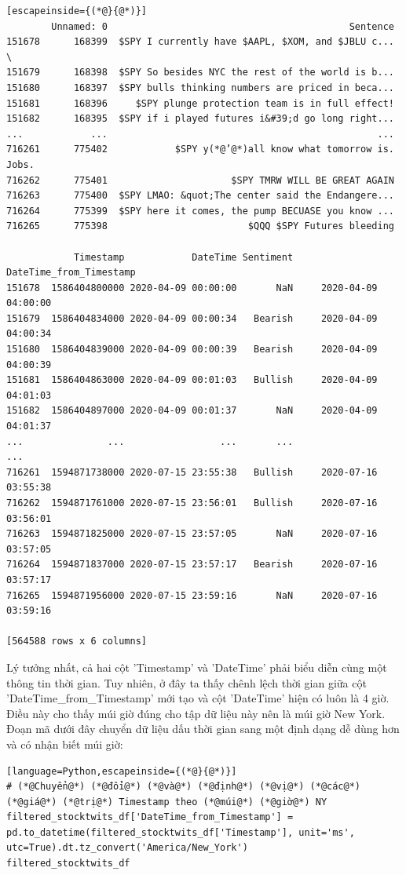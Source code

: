 \begin{lstlisting}[escapeinside={(*@}{@*)}]
        Unnamed: 0                                           Sentence   
151678      168399  $SPY I currently have $AAPL, $XOM, and $JBLU c...  \
151679      168398  $SPY So besides NYC the rest of the world is b...   
151680      168397  $SPY bulls thinking numbers are priced in beca...   
151681      168396     $SPY plunge protection team is in full effect!   
151682      168395  $SPY if i played futures i&#39;d go long right...   
...            ...                                                ...   
716261      775402            $SPY y(*@’@*)all know what tomorrow is. Jobs.   
716262      775401                      $SPY TMRW WILL BE GREAT AGAIN   
716263      775400  $SPY LMAO: &quot;The center said the Endangere...   
716264      775399  $SPY here it comes, the pump BECUASE you know ...   
716265      775398                         $QQQ $SPY Futures bleeding   

            Timestamp            DateTime Sentiment DateTime_from_Timestamp  
151678  1586404800000 2020-04-09 00:00:00       NaN     2020-04-09 04:00:00  
151679  1586404834000 2020-04-09 00:00:34   Bearish     2020-04-09 04:00:34  
151680  1586404839000 2020-04-09 00:00:39   Bearish     2020-04-09 04:00:39  
151681  1586404863000 2020-04-09 00:01:03   Bullish     2020-04-09 04:01:03  
151682  1586404897000 2020-04-09 00:01:37       NaN     2020-04-09 04:01:37  
...               ...                 ...       ...                     ...  
716261  1594871738000 2020-07-15 23:55:38   Bullish     2020-07-16 03:55:38  
716262  1594871761000 2020-07-15 23:56:01   Bullish     2020-07-16 03:56:01  
716263  1594871825000 2020-07-15 23:57:05       NaN     2020-07-16 03:57:05  
716264  1594871837000 2020-07-15 23:57:17   Bearish     2020-07-16 03:57:17  
716265  1594871956000 2020-07-15 23:59:16       NaN     2020-07-16 03:59:16  

[564588 rows x 6 columns]
\end{lstlisting}

Lý tưởng nhất, cả hai cột 'Timestamp' và 'DateTime' phải biểu diễn cùng một thông tin thời gian. Tuy nhiên, ở đây ta thấy chênh lệch thời gian giữa cột 'DateTime\_from\_Timestamp' mới tạo và cột 'DateTime' hiện có luôn là 4 giờ. Điều này cho thấy múi giờ đúng cho tập dữ liệu này nên là múi giờ New York. Đoạn mã dưới đây chuyển dữ liệu dấu thời gian sang một định dạng dễ dùng hơn và có nhận biết múi giờ:

\begin{lstlisting}[language=Python,escapeinside={(*@}{@*)}]
# (*@Chuyển@*) (*@đổi@*) (*@và@*) (*@định@*) (*@vị@*) (*@các@*) (*@giá@*) (*@trị@*) Timestamp theo (*@múi@*) (*@giờ@*) NY
filtered_stocktwits_df['DateTime_from_Timestamp'] = pd.to_datetime(filtered_stocktwits_df['Timestamp'], unit='ms', utc=True).dt.tz_convert('America/New_York')
filtered_stocktwits_df
\end{lstlisting}

